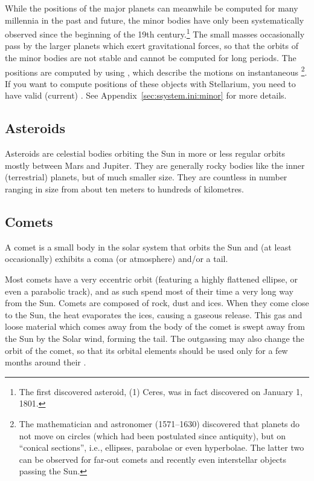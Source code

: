 While the positions of the major planets can meanwhile be computed for
many millennia in the past and future, the minor bodies have only been
systematically observed since the beginning of the 19th
century.\footnote{The first discovered asteroid, (1) Ceres, was in
  fact discovered on January 1, 1801.} The small masses occasionally
pass by the larger planets which exert gravitational forces, so that
the orbits of the minor bodies are not stable and cannot be computed
for long periods. The positions are computed by using
, which describe the motions on
instantaneous \footnote{The mathematician and
  astronomer  (1571--1630) discovered that
  planets do not move on circles (which had been postulated since
  antiquity), but on ``conical sections'', i.e., ellipses, parabolae
  or even hyperbolae. The latter two can be observed for far-out
  comets and recently even interstellar objects passing the Sun.}. If
you want to compute positions of these objects with Stellarium, you
need to have valid (current) . See
Appendix~\ref{sec:ssystem.ini:minor} for more details.

\subsection{Asteroids}
\label{sec:Phenomena:Asteroids}

Asteroids are celestial bodies orbiting the Sun in more or less regular
orbits mostly between Mars and Jupiter. They are generally rocky bodies
like the inner (terrestrial) planets, but of much smaller size. They
are countless in number ranging in size from about ten meters to
hundreds of kilometres.

\subsection{Comets}
\label{sec:Phenomena:Comets}

A comet is a small body in the solar system that orbits the Sun and (at
least occasionally) exhibits a coma (or atmosphere) and/or a tail.

Most comets have a very eccentric orbit (featuring a highly flattened
ellipse, or even a parabolic track), and as such spend most of their
time a very long way from the Sun. Comets are composed of rock, dust
and ices. When they come close to the Sun, the heat evaporates the
ices, causing a gaseous release. This gas and loose material which
comes away from the body of the comet is swept away from the Sun by
the Solar wind, forming the tail. The outgassing may also change the
orbit of the comet, so that its orbital elements should be used only
for a few months around their . 

